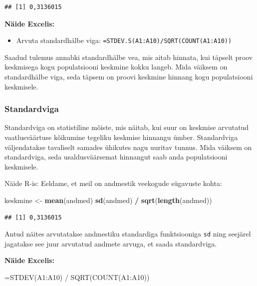 \documentclass[
]{book}
\newenvironment{Shaded}{\begin{snugshade}}{\end{snugshade}}
\newcommand{\FunctionTok}[1]{\textcolor[rgb]{0.13,0.29,0.53}{\textbf{#1}}}
\newcommand{\NormalTok}[1]{#1}
\newcommand{\OtherTok}[1]{\textcolor[rgb]{0.56,0.35,0.01}{#1}}
\newcommand{\SpecialCharTok}[1]{\textcolor[rgb]{0.81,0.36,0.00}{\textbf{#1}}}
\providecommand{\tightlist}{%
  \setlength{\itemsep}{0pt}\setlength{\parskip}{0pt}}
\renewenvironment{Shaded} {\begin{snugshade}\footnotesize} {\end{snugshade}}
\begin{document}
\begin{verbatim}
## [1] 0,3136015
\end{verbatim}

\textbf{Näide Excelis:}

\begin{itemize}
\tightlist
\item
  Arvuta standardhälbe viga: \texttt{=STDEV.S(A1:A10)/SQRT(COUNT(A1:A10))}
\end{itemize}

Saadud tulemus annabki standardhälbe vea, mis aitab hinnata, kui täpselt proov keskmisega kogu populatsiooni keskmine kokku langeb. Mida väiksem on standardhälbe viga, seda täpsem on proovi keskmine hinnang kogu populatsiooni keskmisele.

\subsubsection{Standardviga}\label{standardviga}

Standardviga on statistiline mõiste, mis näitab, kui suur on keskmise arvutatud vaatlusväärtuse kõikumine tegeliku keskmise hinnangu ümber. Standardviga väljendatakse tavaliselt samades ühikutes nagu uuritav tunnus. Mida väiksem on standardviga, seda usaldusväärsemat hinnangut saab anda populatsiooni keskmisele.

Näide R-is:
Eeldame, et meil on andmestik veekogude sügavuste kohta:

\begin{Shaded}
\begin{Highlighting}[]
\NormalTok{keskmine }\OtherTok{\textless{}{-}} \FunctionTok{mean}\NormalTok{(andmed)}
\FunctionTok{sd}\NormalTok{(andmed) }\SpecialCharTok{/} \FunctionTok{sqrt}\NormalTok{(}\FunctionTok{length}\NormalTok{(andmed))}
\end{Highlighting}
\end{Shaded}

\begin{verbatim}
## [1] 0,3136015
\end{verbatim}

Antud näites arvutatakse andmestiku standardiga funktsiooniga \texttt{sd} ning seejärel jagatakse see juur arvutatud andmete arvuga, et saada standardviga.

\textbf{Näide Excelis:}

\begin{Shaded}
\begin{Highlighting}[]
\NormalTok{=STDEV(A1:A10) / SQRT(COUNT(A1:A10))}
\end{Highlighting}
\end{Shaded}
\end{document}
